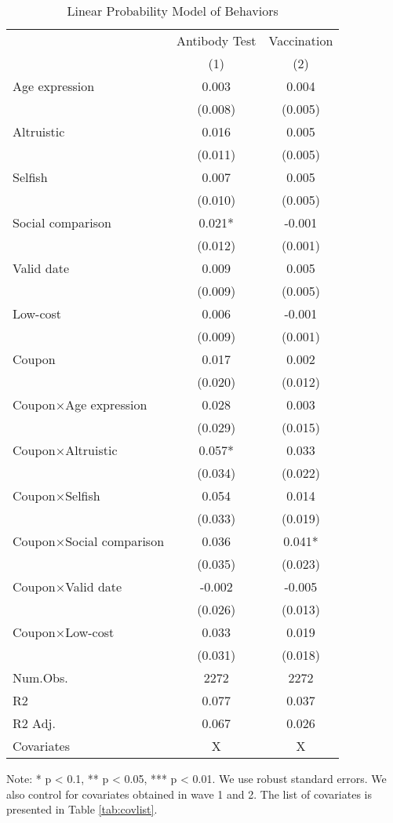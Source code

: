 \documentclass[
  11pt,
  a4paper,
]{article}
\begin{document}
\begin{table}

\caption{\label{tab:act-reg}Linear Probability Model of Behaviors}
\centering
\begin{threeparttable}
\begin{tabular}[t]{lcc}
\toprule
\multicolumn{1}{c}{ } & \multicolumn{1}{c}{Antibody Test} & \multicolumn{1}{c}{Vaccination} \\
\cmidrule(l{3pt}r{3pt}){2-2} \cmidrule(l{3pt}r{3pt}){3-3}
  & (1) & (2)\\
\midrule
Age expression & 0.003 & 0.004\\
 & (0.008) & (0.005)\\
Altruistic & 0.016 & 0.005\\
 & (0.011) & (0.005)\\
Selfish & 0.007 & 0.005\\
 & (0.010) & (0.005)\\
Social comparison & 0.021* & -0.001\\
 & (0.012) & (0.001)\\
Valid date & 0.009 & 0.005\\
 & (0.009) & (0.005)\\
Low-cost & 0.006 & -0.001\\
 & (0.009) & (0.001)\\
Coupon & 0.017 & 0.002\\
 & (0.020) & (0.012)\\
Coupon×Age expression & 0.028 & 0.003\\
 & (0.029) & (0.015)\\
Coupon×Altruistic & 0.057* & 0.033\\
 & (0.034) & (0.022)\\
Coupon×Selfish & 0.054 & 0.014\\
 & (0.033) & (0.019)\\
Coupon×Social comparison & 0.036 & 0.041*\\
 & (0.035) & (0.023)\\
Coupon×Valid date & -0.002 & -0.005\\
 & (0.026) & (0.013)\\
Coupon×Low-cost & 0.033 & 0.019\\
 & (0.031) & (0.018)\\
\midrule
Num.Obs. & 2272 & 2272\\
R2 & 0.077 & 0.037\\
R2 Adj. & 0.067 & 0.026\\
Covariates & X & X\\
\bottomrule
\end{tabular}
\begin{tablenotes}
\item Note: * p < 0.1, ** p < 0.05, *** p < 0.01. We use robust standard errors. We also control for covariates obtained in wave 1 and 2. The list of covariates is presented in Table \ref{tab:covlist}.
\end{tablenotes}
\end{threeparttable}
\end{table}
\end{document}
